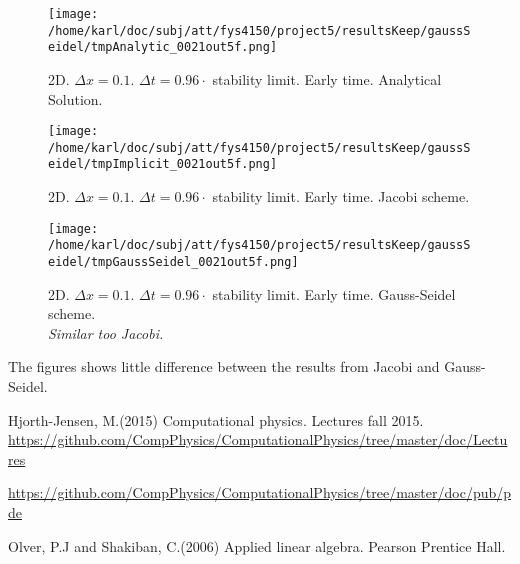 \documentclass{article}
\begin{document}
\begin{minipage}{.30\textwidth}
	\begin{figure}[H]
		\centering
		\texttt{[image: /home/karl/doc/subj/att/fys4150/project5/resultsKeep/gaussSeidel/tmpAnalytic\_0021out5f.png]}
		\caption{2D. $\Delta x = 0.1$. $\Delta t = 0.96 \cdot$ stability limit. Early time. Analytical Solution.\\ \textit{}}
		\label{fig:gs4}
	\end{figure}
\end{minipage}\hfill
\begin{minipage}{.30\textwidth} 
	\begin{figure}[H]
		\centering
		\texttt{[image: /home/karl/doc/subj/att/fys4150/project5/resultsKeep/gaussSeidel/tmpImplicit\_0021out5f.png]}
		\caption{2D. $\Delta x = 0.1$. $\Delta t = 0.96 \cdot$ stability limit. Early time. Jacobi scheme.\\ \textit{}}
		\label{fig:gs5}
	\end{figure}
\end{minipage}\hfill
\begin{minipage}{.30\textwidth} 
	\begin{figure}[H]
		\centering
		\texttt{[image: /home/karl/doc/subj/att/fys4150/project5/resultsKeep/gaussSeidel/tmpGaussSeidel\_0021out5f.png]}
		\caption{2D. $\Delta x = 0.1$. $\Delta t = 0.96 \cdot$ stability limit. Early time. Gauss-Seidel scheme.\\ \textit{Similar too Jacobi.}}
		\label{fig:gs6}
	\end{figure}
\end{minipage}\hfill
\vspace{2ex}

The figures shows little difference between the results from Jacobi and Gauss-Seidel.


\begin{thebibliography}{9}
	Hjorth-Jensen, M.(2015)
	Computational physics. Lectures fall 2015. 
	\url{https://github.com/CompPhysics/ComputationalPhysics/tree/master/doc/Lectures}
	
	\url{https://github.com/CompPhysics/ComputationalPhysics/tree/master/doc/pub/pde}
	
	Olver, P.J and Shakiban, C.(2006)
	Applied linear algebra. Pearson Prentice Hall. 

\end{thebibliography}
\end{document}

